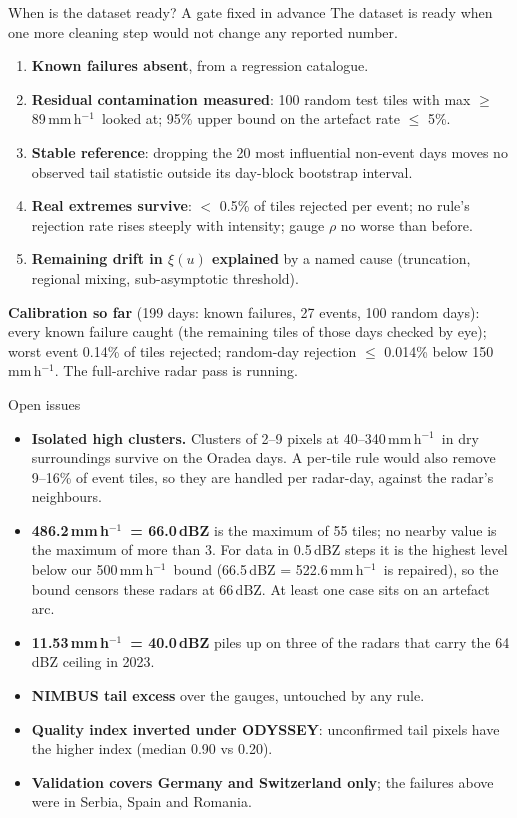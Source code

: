 \documentclass[aspectratio=169,10pt]{beamer}
\newcommand{\mmh}{\,mm\,h$^{-1}$}
\begin{document}
\begin{frame}{When is the dataset ready? A gate fixed in advance}
  \small
  The dataset is ready when one more cleaning step would not change any reported number.
  \begin{enumerate}
    \item \textbf{Known failures absent}, from a regression catalogue.
    \item \textbf{Residual contamination measured}: 100 random test tiles with max $\ge$ 89\mmh\
      looked at; 95\% upper bound on the artefact rate $\le$ 5\%.
    \item \textbf{Stable reference}: dropping the 20 most influential non-event days moves no
      observed tail statistic outside its day-block bootstrap interval.
    \item \textbf{Real extremes survive}: $<$ 0.5\% of tiles rejected per event; no rule's
      rejection rate rises steeply with intensity; gauge $\rho$ no worse than before.
    \item \textbf{Remaining drift in $\xi(u)$ explained} by a named cause (truncation,
      regional mixing, sub-asymptotic threshold).
  \end{enumerate}
  \vspace{2mm}
  \textbf{Calibration so far} (199 days: known failures, 27 events, 100 random days): every
  known failure caught (the remaining tiles of those days checked by eye); worst event 0.14\%
  of tiles rejected; random-day rejection $\le$ 0.014\% below 150\mmh. The full-archive radar
  pass is running.
\end{frame}

\begin{frame}{Open issues}
  \small
  \begin{itemize}
    \item \textbf{Isolated high clusters.} Clusters of 2--9 pixels at 40--340\mmh\ in dry
      surroundings survive on the Oradea days. A per-tile rule would also remove 9--16\% of
      event tiles, so they are handled per radar-day, against the radar's neighbours.
    \item \textbf{486.2\mmh\ = 66.0\,dBZ} is the maximum of 55 tiles; no nearby value is the
      maximum of more than 3. For data in 0.5\,dBZ steps it is the highest level below our
      500\mmh\ bound (66.5\,dBZ = 522.6\mmh\ is repaired), so the bound censors these radars
      at 66\,dBZ. At least one case sits on an artefact arc.
    \item \textbf{11.53\mmh\ = 40.0\,dBZ} piles up on three of the radars that carry the 64\,dBZ
      ceiling in 2023.
    \item \textbf{NIMBUS tail excess} over the gauges, untouched by any rule.
    \item \textbf{Quality index inverted under ODYSSEY}: unconfirmed tail pixels have the
      higher index (median 0.90 vs 0.20).
    \item \textbf{Validation covers Germany and Switzerland only}; the failures above were in
      Serbia, Spain and Romania.
  \end{itemize}
\end{frame}
\end{document}

